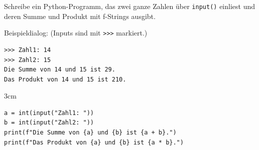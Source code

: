 \question[3]
Schreibe ein Python-Programm, das zwei ganze Zahlen über \texttt{input()} einliest
und deren Summe und Produkt mit f-Strings ausgibt.

Beispieldialog:  (Inputs sind mit \lstinline|>>>| markiert.)
\begin{lstlisting}
>>> Zahl1: 14
>>> Zahl2: 15
Die Summe von 14 und 15 ist 29.
Das Produkt von 14 und 15 ist 210.
\end{lstlisting}
\begin{solutionbox}{3cm}
\begin{lstlisting}
a = int(input("Zahl1: "))
b = int(input("Zahl2: "))
print(f"Die Summe von {a} und {b} ist {a + b}.")
print(f"Das Produkt von {a} und {b} ist {a * b}.")
\end{lstlisting}
\end{solutionbox}